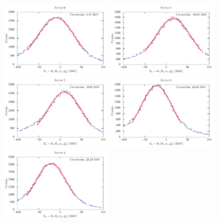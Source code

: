\documentclass{article}
\begin{document}
\begin{figure}[p]
\centering
\includegraphics[width=0.49\textwidth]{Ecorr/corr_0.pdf}
\includegraphics[width=0.49\textwidth]{Ecorr/corr_1.pdf}\\
\includegraphics[width=0.49\textwidth]{Ecorr/corr_2.pdf}
\includegraphics[width=0.49\textwidth]{Ecorr/corr_3.pdf}\\
\includegraphics[width=0.49\textwidth]{Ecorr/corr_4.pdf}

\end{figure}
\end{document}

